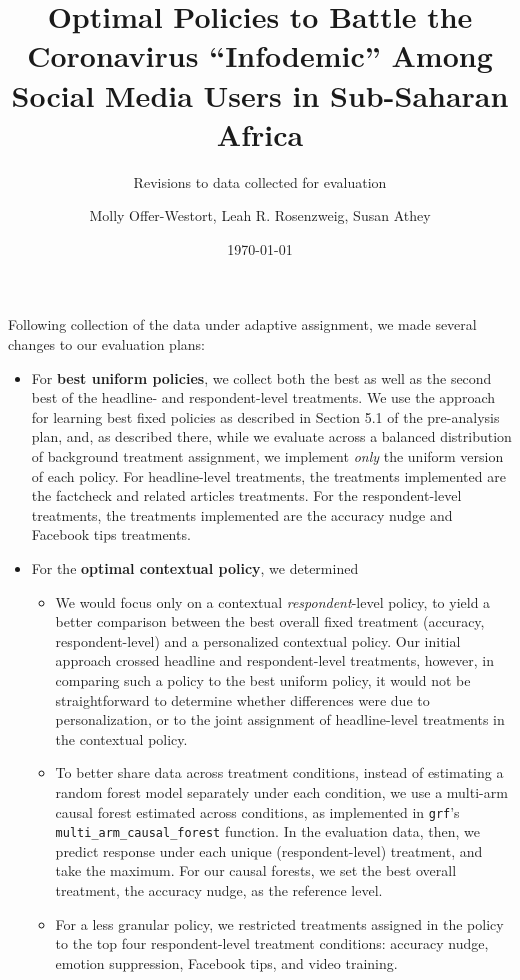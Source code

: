 \documentclass[letterpaper, 12pt, parskip=full,DIV=10]{scrartcl}
\title{Optimal Policies to Battle the Coronavirus ``Infodemic'' Among Social Media Users in Sub-Saharan Africa}
\subtitle{Revisions to data collected for evaluation}
\author{Molly Offer-Westort, Leah R. Rosenzweig, Susan Athey}
\date{\today}
\begin{document}
%
\normalsize%
\maketitle%

Following collection of the data under adaptive assignment, we made several changes to our evaluation plans:

\begin{itemize}
\item For \textbf{best uniform policies}, we collect both the best as well as the second best of the headline- and respondent-level treatments. We use the approach for learning best fixed policies as described in Section 5.1 of the pre-analysis plan, and, as described there, while we evaluate across a balanced distribution of background treatment assignment, we implement \textit{only} the uniform version of each policy. For headline-level treatments, the treatments implemented are the factcheck and related articles treatments. For the respondent-level treatments, the treatments implemented are the accuracy nudge and Facebook tips treatments. 
\item For the \textbf{optimal contextual policy}, we determined 
\begin{itemize}
\item We would focus {only} on a contextual \textit{respondent}-level policy, to yield a better comparison between the best overall fixed treatment (accuracy, respondent-level) and a personalized contextual policy. Our initial approach crossed headline and respondent-level treatments, however, in comparing such a policy to the best uniform policy, it would not be straightforward to determine whether differences were due to personalization, or to the joint assignment of headline-level treatments in the contextual policy. 
\item To better share data across treatment conditions, instead of estimating a random forest model separately under each condition, we use a multi-arm causal forest estimated across conditions, as implemented in \texttt{grf}'s \texttt{multi\_arm\_causal\_forest} function. In the evaluation data, then, we predict response under each unique (respondent-level) treatment, and take the maximum. For our causal forests, we set the best overall treatment, the accuracy nudge, as the reference level. 
\item For a less granular policy, we restricted treatments assigned in the policy to the top four respondent-level treatment conditions: accuracy nudge, emotion suppression, Facebook tips, and video training. 
\end{itemize}
\end{itemize}
\end{document}
